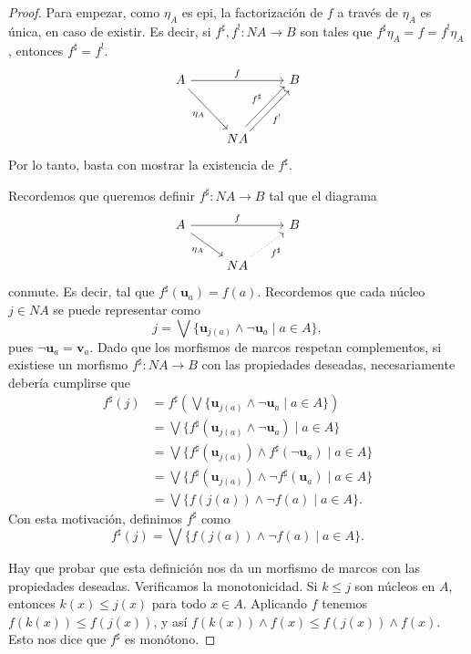 \documentclass[12pt,letterpaper,titlepage]{article}
\theoremstyle{definition}
\newcommand\Sup{\bigvee}
\renewcommand\inf{\wedge}
\newcommand\unuc[1]{\mathbf u_{#1}}
\newcommand\vnuc[1]{\mathbf v_{#1}}
\newcommand\<{\langle}
\renewcommand\>{\rangle}
\begin{document}
\begin{proof}
  Para empezar, como $\eta_A$ es epi, la factorización de $f$ a
  través de $\eta_A$ es única, en caso de existir.
  Es decir, si $f^\sharp,f^!:NA\to B$ son tales que
  $f^\sharp\eta_A=f=f^!\eta_A$, entonces $f^\sharp=f^!$.
  \[
    \begin{tikzcd}
      A \ar[dr,"\eta_A"'] \ar[rr,"f"] && B \\[5mm]
      & NA \ar[ur,shift right,"f^!"'] \ar[ur,shift left,"f^\sharp"]
    \end{tikzcd}
  \]
  Por lo tanto, basta con mostrar la existencia de $f^\sharp$.
  
  Recordemos que queremos definir $f^\sharp:NA\to B$ tal que el
  diagrama 
  \[
    \begin{tikzcd}
      A \ar[dr,"\eta_A"'] \ar[rr,"f"] && B \\
      & NA \ar[ur,"f^\sharp"',dotted]
    \end{tikzcd}
  \]
  conmute.
  Es decir, tal que $f^\sharp(\unuc a) = f(a)$.
  Recordemos que cada núcleo $j\in NA$ se puede representar como
  \[
    j = \Sup\{\unuc{j(a)} \inf \neg \unuc a \mid a\in A\}
  ,\]
  pues $\neg\unuc a = \vnuc a$.
  Dado que los morfismos de marcos respetan complementos,
  si existiese un morfismo $f^\sharp:NA\to B$ con las propiedades
  deseadas, necesariamente debería cumplirse que
  \begin{align*}
    f^\sharp(j)
    &= f^\sharp\left(
      \Sup\{\unuc{j(a)}\inf\neg\unuc a\mid a\in A\}
      \right) \\
    &= \Sup\{f^\sharp(\unuc{j(a)}\inf\neg\unuc a)\mid a\in A\} \\
    &= \Sup\{f^\sharp(\unuc{j(a)})\inf f^\sharp(\neg\unuc a)
       \mid a\in A\} \\
    &= \Sup\{f^\sharp(\unuc{j(a)})\inf \neg f^\sharp(\unuc a)
       \mid a\in A\} \\
    &= \Sup\{f(j(a))\inf \neg f(a) \mid a\in A\}.
  \end{align*}
  Con esta motivación, definimos $f^\sharp$ como
  \[
    f^\sharp(j) = \Sup\{f(j(a))\inf\neg f(a) \mid a\in A\}
  .\]
  
  Hay que probar que esta definición nos da un morfismo de marcos
  con las propiedades deseadas.
  Verificamos la monotonicidad.
  Si $k\leq j$ son núcleos en $A$, entonces $k(x)\leq j(x)$ para
  todo $x\in A$.
  Aplicando $f$ tenemos $f(k(x))\leq f(j(x))$, y así $f(k(x))\inf
  f(x)\leq f(j(x))\inf f(x)$.
  Esto nos dice que $f^\sharp$ es monótono.


\end{proof}
\end{document}
